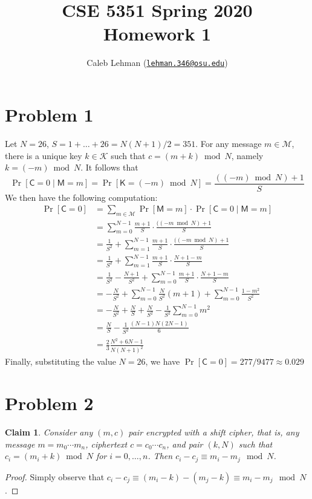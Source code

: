 \documentclass[12pt]{article}
\title{%
CSE 5351 Spring 2020\\
Homework 1
}
\author{%
Caleb Lehman
(\href{mailto:lehman.346@osu.edu}{\texttt{lehman.346@osu.edu}})
}
\date{%
}
\numberwithin{equation}{section}
\theoremstyle{plain}
\newtheorem{claim}{Claim}
\DeclareMathOperator*{\prob}{Pr}
\newcommand{\given}{\mid}
\newcommand{\ctext}{\algo{C}}
\newcommand{\ptexts}{\mathcal{M}}
\newcommand{\ptext}{\algo{M}}
\newcommand{\keys}{\mathcal{K}}
\newcommand{\key}{\algo{K}}
\newcommand{\algo}[1]{\mathsf{#1}}
\begin{document}
\maketitle

\section*{Problem 1}

Let $N = 26$, $S = 1 + \ldots + 26 = N(N+1) / 2 = 351$.
For any message $m \in \ptexts$,
there is a unique key $k \in \keys$ such that $c = (m + k) \bmod N$,
namely $k = (-m) \bmod N$.
It follows that
\begin{equation*}
    \prob[\ctext = 0 \given \ptext = m] = \prob[\key = (-m) \bmod N] = \frac{((-m) \bmod N) + 1}{S}
\end{equation*}
We then have the following computation:
\begin{align*}
    \prob[\ctext = 0]
        &= \sum_{m \in \ptexts}{ \prob[\ptext = m] \cdot \prob[\ctext = 0 \given \ptext = m] } \\
        &= \sum_{m = 0}^{N-1}{ \frac{m + 1}{S} \cdot \frac{((-m \bmod N) + 1}{S} } \\
        &= \frac{1}{S^2} + \sum_{m = 1}^{N-1}{ \frac{m + 1}{S} \cdot \frac{((-m \bmod N) + 1}{S} } \\
        &= \frac{1}{S^2} + \sum_{m = 1}^{N-1}{ \frac{m + 1}{S} \cdot \frac{N+1-m}{S} } \\
        &= \frac{1}{S^2} - \frac{N + 1}{S^2} + \sum_{m = 0}^{N-1}{ \frac{m + 1}{S} \cdot \frac{N+1-m}{S} } \\
        &= -\frac{N}{S^2} + \sum_{m = 0}^{N-1}{ \frac{N}{S^2} (m+1) } + \sum_{m = 0}^{N-1}{ \frac{1 - m^2}{S^2} } \\
        &= -\frac{N}{S^2} + \frac{N}{S} + \frac{N}{S^2} - \frac{1}{S^2} \sum_{m = 0}^{N-1}{ m^2 } \\
        &= \frac{N}{S} - \frac{1}{S^2} \frac{(N-1)N(2N-1)}{6} \\
        &= \frac{2}{3} \frac{N^2 + 6N - 1}{N(N+1)^2}
\end{align*}
Finally, substituting the value $N = 26$, we have $\prob[\ctext = 0] = 277 / 9477 \approx 0.029$


\section*{Problem 2}

\begin{claim}\label{claim:shift-cipher-property}
Consider any $(m, c)$ pair encrypted with a shift cipher,
that is,
any message $m = m_0 \cdots m_n$,
ciphertext $c = c_0 \cdots c_n$,
and pair $(k, N)$
such that $c_i = (m_i + k) \bmod N$ for $i = 0, \ldots, n$.
Then $c_i - c_j \equiv m_i - m_j \mod N$.
\end{claim}
\begin{proof}
Simply observe that $c_i - c_j \equiv (m_i - k) - (m_j - k) \equiv m_i - m_j \mod N$.
\end{proof}
\end{document}
